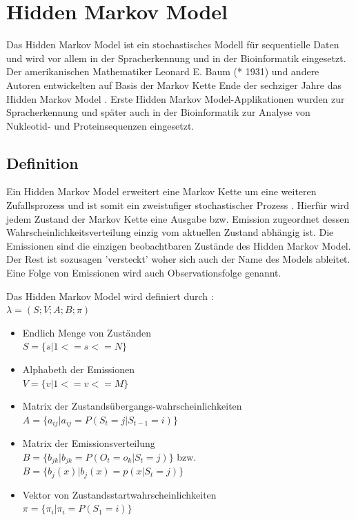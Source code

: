 \chapter{Hidden Markov Model}
\label{mainsec:hmm}

Das Hidden Markov Model ist ein stochastisches Modell für sequentielle Daten und wird vor allem in der Spracherkennung und in der Bioinformatik eingesetzt. 
Der amerikanischen Mathematiker Leonard E. Baum (* 1931) und andere Autoren entwickelten auf Basis der Markov Kette Ende der 
sechziger Jahre das Hidden Markov Model \cite{baum66}. Erste Hidden Markov Model-Applikationen wurden zur Spracherkennung und später auch in der Bioinformatik zur Analyse von Nukleotid- und Proteinsequenzen eingesetzt. 


\section{Definition}
Ein Hidden Markov Model erweitert eine Markov Kette um eine weiteren Zufallsprozess und ist somit ein zweistufiger stochastischer Prozess \cite[67]{mmmFink}. Hierfür wird
jedem Zustand der Markov Kette eine Ausgabe bzw. Emission zugeordnet dessen Wahrscheinlichkeitsverteilung einzig vom aktuellen Zustand abhängig ist. Die Emissionen sind die einzigen beobachtbaren Zustände des Hidden Markov Model. Der Rest ist sozusagen 'versteckt' woher sich auch der Name des Models ableitet. Eine Folge von Emissionen wird auch Observationsfolge genannt.


Das Hidden Markov Model wird definiert durch \cite[68]{mmmFink}:\\ 
\( \lambda = (S;V;A;B;\pi)\)
\begin{itemize}
     \item Endlich Menge von Zuständen \\
           \( S = \{ s | 1 <= s <= N \} \)
     \item Alphabeth der Emissionen \\
           \( V = \{ v | 1 <= v <= M \} \)
     \item Matrix der Zustandsübergangs-wahrscheinlichkeiten \\
           \( A = \{ a_{ij} | a_{ij} = P(S_t = j | S_{t-1} = i) \} \)
     \item Matrix der Emissionsverteilung \\
           \( B = \{ b_{jk} | b_{jk} = P(O_t = o_k | S_t = j) \} \) bzw. \( B =
           \{ b_{j}(x) | b_{j}(x) = p(x|S_t = j) \} \)
     \item Vektor von Zustandsstartwahrscheinlichkeiten \\
           \( \pi = \{ \pi_i | \pi_i = P(S_1 = i) \} \) 
\end{itemize}

